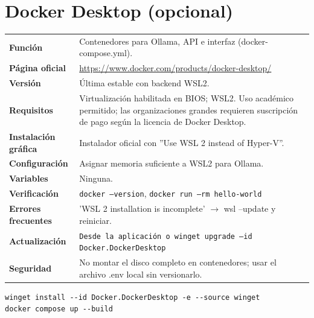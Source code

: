 \section{Docker Desktop (opcional)}
{\small\begin{tabularx}{\linewidth}{@{}>{\bfseries}p{2.9cm}X@{}}\toprule
Función & Contenedores para Ollama, API e interfaz (docker-compose.yml).\\
Página oficial & \url{https://www.docker.com/products/docker-desktop/}\\
Versión & Última estable con backend WSL2.\\
Requisitos & Virtualización habilitada en BIOS; WSL2. Uso académico permitido; las organizaciones grandes requieren suscripción de pago según la licencia de Docker Desktop.\\
Instalación gráfica & Instalador oficial con ''Use WSL 2 instead of Hyper-V''.\\
Configuración & Asignar memoria suficiente a WSL2 para Ollama.\\
Variables & Ninguna.\\
Verificación & \texttt{docker --version}, \texttt{docker run --rm hello-world}\\
Errores frecuentes & 'WSL 2 installation is incomplete' $\rightarrow$ wsl --update y reiniciar.\\
Actualización & \texttt{Desde la aplicación o winget upgrade --id Docker.DockerDesktop}\\
Seguridad & No montar el disco completo en contenedores; usar el archivo .env local sin versionarlo.\\
\bottomrule\end{tabularx}}
\begin{lstlisting}[style=ps]
winget install --id Docker.DockerDesktop -e --source winget
docker compose up --build
\end{lstlisting}

